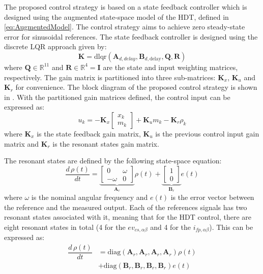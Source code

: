 The proposed control strategy is based on a state feedback controller which is designed using the augmented state-space model of the HDT, defined in \eqref{eq:AugmentedModel}. The control strategy aims to achieve zero steady-state error for sinusoidal references. The state feedback controller is designed using the discrete LQR approach given by:
\begin{equation}
    \mathbf{K} = \text{dlqr}(\mathbf{A}_{d,delay}, \mathbf{B}_{d,\text{delay}}, \mathbf{Q}, \mathbf{R})
\end{equation}
where $\mathbf{Q}\in\mathbb{R}^{11}$ and $\mathbf{R}\in\mathbb{R}^4 = \mathbf{I}$ are the state and input weighting matrices, respectively. The gain matrix is partitioned into three sub-matrices: $\mathbf{K}_x$, $\mathbf{K}_u$ and $\mathbf{K}_r$ for convenience. The block diagram of the proposed control strategy is shown in . With the partitioned gain matrices defined, the control input can be expressed as:
\begin{equation}
    u_k = -\mathbf{K}_x
    \begin{bmatrix}
        x_k\\
        m_k
    \end{bmatrix} + \mathbf{K}_u m_k - \mathbf{K}_r \rho_k
\end{equation}
where $\mathbf{K}_x$ is the state feedback gain matrix, $\mathbf{K}_u$ is the previous control input gain matrix and $\mathbf{K}_r$ is the resonant states gain matrix.

The resonant states are defined by the following state-space equation:
\begin{equation}
    \dfrac{d\,\rho(t)}{dt} = 
    \underbrace{
    \begin{bmatrix}
        0 & \omega \\
        -\omega & 0
    \end{bmatrix}
    }_{\mathbf{A}_r}
    \rho(t) + 
    \underbrace{
    \begin{bmatrix}
        1\\
        0
    \end{bmatrix}
    }_{\mathbf{B}_r}
    e(t)
\end{equation}
where $\omega$ is the nominal angular frequency and $e(t)$ is the error vector between the reference and the measured output. Each of the references signals has two resonant states associated with it, meaning that for the HDT control, there are eight resonant states in total (4 for the $ev_{cs,\alpha\beta}$ and 4 for the $i_{fp,\alpha\beta}$). This can be expressed as:
\begin{align}
    \dfrac{d\,\rho(t)}{dt} &= \text{diag}(\mathbf{A}_r, \mathbf{A}_r, \mathbf{A}_r, \mathbf{A}_r)\rho(t)\\
    &+ \text{diag}(\mathbf{B}_r, \mathbf{B}_r, \mathbf{B}_r, \mathbf{B}_r)e(t)
\end{align}


